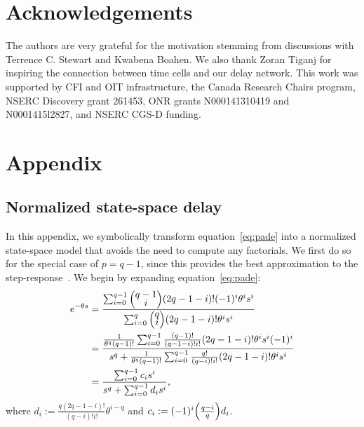 \documentclass[12pt]{article}
\theoremstyle{definition}
\let\originalleft\left
\let\originalright\right
\renewcommand{\left}{\mathopen{}\mathclose\bgroup\originalleft}
\renewcommand{\right}{\aftergroup\egroup\originalright}
\newenvironment{hpmatrix}{\begingroup\def\arraystretch{0.5}\begin{pmatrix}}{\end{pmatrix}\endgroup\ignorespacesafterend}
\begin{document}
\section*{Acknowledgements}

The authors are very grateful for the motivation stemming from discussions with Terrence C. Stewart and Kwabena Boahen.
We also thank Zoran Tiganj for inspiring the connection between time cells and our delay network.
This work was supported by CFI and OIT infrastructure, the Canada Research Chairs program, NSERC Discovery grant 261453, ONR grants N000141310419 and N0001415l2827, and NSERC CGS-D funding.

\appendix\section{Appendix}

\subsection{Normalized state-space delay}
\label{app:ss-delay}

In this appendix, we symbolically transform equation~\ref{eq:pade} into a normalized state-space model that avoids the need to compute any factorials.
We first do so for the special case of $p = q - 1$, since this provides the best approximation to the step-response~\citep{vajta2000some}.
We begin by expanding equation~\ref{eq:pade}:
\begin{align*}
[q-1/q]e^{-\theta s} &= \frac{\sum_{i=0}^{q-1} \begin{hpmatrix}{q-1} \\ i\end{hpmatrix} (2q - 1 - i)! (-1)^i \theta^i s^i}{\sum_{i=0}^q \begin{hpmatrix}q \\ i\end{hpmatrix} (2q - 1 - i)! \theta^i s^i} \\
&= \frac{\frac{1}{\theta^{q} (q-1)!} \sum_{i=0}^{q-1} \frac{(q-1)!}{(q-1-i)!i!} (2q - 1- i)! \theta^i s^i (-1)^i}{s^q + \frac{1}{\theta^q (q-1)!}  \sum_{i=0}^{q-1} \frac{q!}{(q-i)!i!} (2q - 1 - i)! \theta^i s^i} \\
&= \frac{\sum_{i=0}^{q-1} c_i s^i}{s^q + \sum_{i=0}^{q-1} d_i s^i} \text{,}
\end{align*}
where $d_i := \frac{q(2q - 1 - i)!}{(q-i)!i!} \theta^{i-q}$ and $c_i := (-1)^i \left( \frac{q-i}{q} \right) d_i$.
\end{document}

